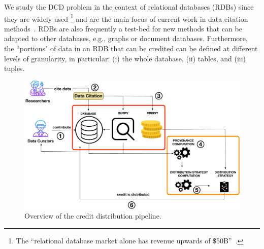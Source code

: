 

We study the DCD problem in the context of 
relational databases (RDBs) since they are widely used \footnote{The ``relational database
market alone has revenue upwards of \$50B''~\citep{AbadiEtAl2020}. } and are the main focus of current work in data citation methods~\citep{buneman2010rule,bunemann2016citation,ProllR13}.  
RDBs are also frequently a test-bed for new methods that can be adapted to other databases, e.g., graphs or document databases.
Furthermore, the ``portions" of data in an RDB that can be credited can be defined at different levels of granularity, in particular: (i) the whole database, (ii)  tables, and (iii) tuples.



\begin{figure}[]
    \centering
    \includegraphics[width=.85\textwidth]{figures/overview}
    \caption{Overview of the credit distribution pipeline.}
    \label{fig:system_overview}
\end{figure}

